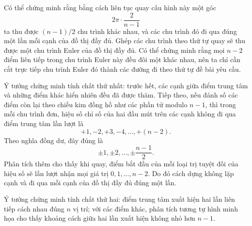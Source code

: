 \documentclass[11pt]{article}
\begin{document}
\begin{center}
\end{center}

Có thể chứng minh rằng bằng cách liên tục quay cấu hình này một góc
\[
  2\pi\cdot\frac{2}{n-1}
\]
ta thu được $(n-1)/2$ chu trình khác nhau, và các chu trình đó đi qua đúng
một lần mỗi cạnh của đồ thị đầy đủ. Ghép các chu trình theo thứ tự quay sẽ
thu được một chu trình Euler của đồ thị đầy đủ. Có thể chứng minh rằng mọi
$n-2$ điểm liên tiếp trong chu trình Euler này đều đôi một khác nhau, nên ta
chỉ cần cắt trực tiếp chu trình Euler đó thành các đường đi theo thứ tự đề
bài yêu cầu.

Ý tưởng chứng minh tính chất thứ nhất: trước hết, các cạnh giữa điểm trung
tâm và những điểm khác hiển nhiên đều đã được thăm. Tiếp theo, nếu đánh số
các điểm còn lại theo chiều kim đồng hồ như các phần tử modulo $n-1$, thì
trong mỗi chu trình đơn, hiệu số chỉ số của hai đầu mút trên các cạnh không
đi qua điểm trung tâm lần lượt là
\[
  +1,-2,+3,-4,\ldots,+(n-2).
\]
Theo nghĩa đồng dư, đây đúng là
\[
  \pm 1,\pm 2,\ldots,\pm\frac{n-1}{2}.
\]
Phân tích thêm cho thấy khi quay, điểm bắt đầu của mỗi loại trị tuyệt đối
của hiệu số sẽ lần lượt nhận mọi giá trị $0,1,\ldots,n-2$. Do đó cách dựng
không lặp cạnh và đi qua mỗi cạnh của đồ thị đầy đủ đúng một lần.

Ý tưởng chứng minh tính chất thứ hai: điểm trung tâm xuất hiện hai lần liên
tiếp cách nhau đúng $n$ vị trí; với các điểm khác, phân tích tương tự hình
minh họa cho thấy khoảng cách giữa hai lần xuất hiện không nhỏ hơn $n-1$.
\end{document}
